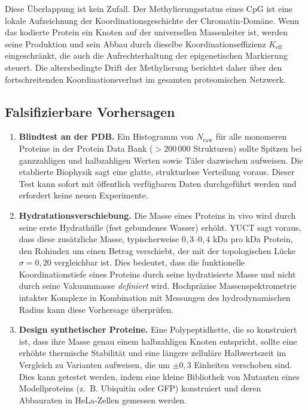 \documentclass[12pt,a4paper]{article}
\begin{document}
	Diese Überlappung ist kein Zufall. Der Methylierungsstatus eines CpG ist eine lokale Aufzeichnung der Koordinationsgeschichte der Chromatin‑Domäne. Wenn das kodierte Protein ein Knoten auf der universellen Massenleiter ist, werden seine Produktion und sein Abbau durch dieselbe Koordinationseffizienz \(K_{\mathrm{eff}}\) eingeschränkt, die auch die Aufrechterhaltung der epigenetischen Markierung steuert. Die altersbedingte Drift der Methylierung berichtet daher über den fortschreitenden Koordinationsverlust im gesamten proteomischen Netzwerk.
	
	\subsection{Falsifizierbare Vorhersagen}
	\begin{enumerate}
		\item \textbf{Blindtest an der PDB.} Ein Histogramm von \(N_{\mathrm{raw}}\) für alle monomeren Proteine in der Protein Data Bank (\(>200\,000\) Strukturen) sollte Spitzen bei ganzzahligen und halbzahligen Werten sowie Täler dazwischen aufweisen. Die etablierte Biophysik sagt eine glatte, strukturlose Verteilung voraus. Dieser Test kann sofort mit öffentlich verfügbaren Daten durchgeführt werden und erfordert keine neuen Experimente.
		\item \textbf{Hydratationsverschiebung.} Die Masse eines Proteins in vivo wird durch seine erste Hydrathülle (fest gebundenes Wasser) erhöht. YUCT sagt voraus, dass diese zusätzliche Masse, typischerweise \(0,3\)--\(0,4\) kDa pro kDa Protein, den Rohindex um einen Betrag verschiebt, der mit der topologischen Lücke \(\sigma = 0,20\) vergleichbar ist. Dies bedeutet, dass die funktionelle Koordinationstiefe eines Proteins durch seine hydratisierte Masse und nicht durch seine Vakuummasse \emph{definiert} wird. Hochpräzise Massenspektrometrie intakter Komplexe in Kombination mit Messungen des hydrodynamischen Radius kann diese Vorhersage überprüfen.
		\item \textbf{Design synthetischer Proteine.} Eine Polypeptidkette, die so konstruiert ist, dass ihre Masse genau einem halbzahligen Knoten entspricht, sollte eine erhöhte thermische Stabilität und eine längere zelluläre Halbwertszeit im Vergleich zu Varianten aufweisen, die um \(\pm 0,3\) Einheiten verschoben sind. Dies kann getestet werden, indem eine kleine Bibliothek von Mutanten eines Modellproteins (z.~B. Ubiquitin oder GFP) konstruiert und deren Abbauraten in HeLa‑Zellen gemessen werden.
	\end{enumerate}
	
\end{document}
